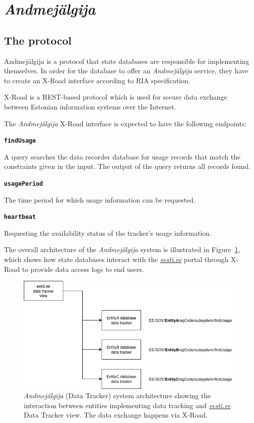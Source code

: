 \section{\textit{Andmejälgija}} \label{Andmejälgija}

\subsection{The protocol} \label{protocol_desc}

Andmejälgija is a protocol that state databases are responsible for implementing themselves. In order for the database to offer an \textit{Andmejälgija} service, they have to create an X-Road interface according to RIA specification\cite{aj-github-spec}. 

X-Road is a REST-based protocol which is used for secure data exchange between Estonian information systems over the Internet.

The \textit{Andmejälgija} X-Road interface is expected to have the following endpoints:

\textbf{\texttt{findUsage}}

A query searches the data recorder database for usage records that match the constraints given in the input. The output of the query returns all records found\cite{aj-github-spec}.

\textbf{\texttt{usagePeriod}}

The time period for which usage information can be requested\cite{aj-github-spec}.

\textbf{\texttt{heartbeat}}

Requesting the availability status of the tracker's usage information\cite{aj-github-spec}.

The overall architecture of the \textit{Andmejälgija} system is illustrated in Figure~\ref{fig:aj-model}, which shows how state databases interact with the \textit{\href{https://www.eesti.ee}{eesti.ee}} portal through X-Road to provide data access logs to end users.

\begin{figure}[H]
\centering
\includegraphics[width=450px]{english/figures/aj_model.PNG}
\caption{\textit{Andmejälgija} (Data Tracker) system architecture showing the interaction between entities implementing data tracking and \textit{\href{https://www.eesti.ee}{eesti.ee}} Data Tracker view. The data exchange happens via X-Road\cite{aj-github}.}
\label{fig:aj-model}
\end{figure}

